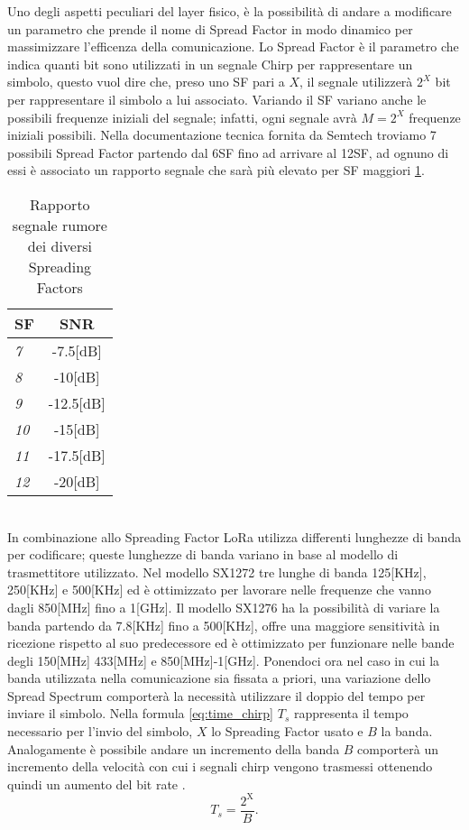Uno degli aspetti peculiari del layer fisico, è la possibilità di andare a
modificare un parametro che prende il nome di Spread Factor in modo dinamico per
massimizzare l'efficenza della comunicazione.
Lo Spread Factor è il parametro che indica quanti bit sono utilizzati in un segnale Chirp
per rappresentare un simbolo, questo vuol dire che, preso uno 
SF pari a $X$, il segnale  utilizzerà $2^X$ bit per rappresentare il simbolo a lui
associato. Variando il SF variano anche le possibili frequenze iniziali del
segnale; infatti, ogni segnale avrà $M=2^X$ frequenze iniziali possibili.
Nella documentazione tecnica fornita da Semtech troviamo 7 possibili Spread
Factor partendo dal 6SF fino ad arrivare al 12SF, ad ognuno di essi è associato un
rapporto segnale che sarà più elevato per SF maggiori \ref{tab:SNR}. 
\begin{table}[h]
        \centering
        \begin{tabular}{l|c}
                \textbf{SF}  & SNR \\
                \hline
                \emph{7}  & -7.5[dB] \\
                \emph{8}  & -10[dB]  \\
                \emph{9}   & -12.5[dB]  \\
                \emph{10} & -15[dB] \\
                \emph{11} & -17.5[dB] \\
                \emph{12} & -20[dB] \\
        \end{tabular}
        \caption{Rapporto segnale rumore dei diversi Spreading Factors}
        \label{tab:SNR}
\end{table}
\\
In combinazione allo Spreading Factor LoRa utilizza differenti lunghezze di 
banda per codificare; queste lunghezze di banda variano in base al modello di
trasmettitore utilizzato. Nel modello SX1272 tre lunghe di banda 125[KHz],
250[KHz] e 500[KHz] ed è ottimizzato per lavorare nelle frequenze che vanno
dagli  850[MHz] fino a  1[GHz]. Il modello SX1276 ha la possibilità di variare
la banda partendo da 7.8[KHz] fino a 500[KHz], offre una maggiore sensitività in
ricezione rispetto al suo predecessore ed è ottimizzato per funzionare nelle
bande degli 150[MHz] 433[MHz] e 850[MHz]-1[GHz].
Ponendoci ora nel caso in cui la banda utilizzata
nella comunicazione sia fissata a priori, una variazione dello Spread Spectrum
comporterà la necessità utilizzare il doppio del tempo per inviare il simbolo.
Nella formula \ref{eq:time_chirp} $T_s$ rappresenta il tempo necessario per
l'invio del simbolo, $X$ lo Spreading Factor usato e $B$ la banda.
Analogamente è possibile andare un incremento della banda $B$ comporterà un
incremento della velocità con cui i segnali chirp vengono trasmessi ottenendo
quindi un aumento del bit rate .
\begin{equation}\label{eq:time_chirp}
        T_s=\frac{2^{\text{X}}}{B}.
\end{equation}

